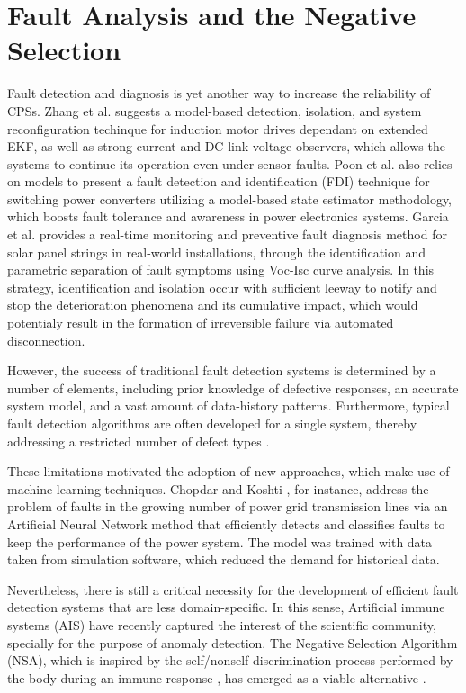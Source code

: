 \section{Fault Analysis and the Negative Selection}

Fault detection and diagnosis is yet another way to increase the reliability of CPSs. Zhang et al. \cite{zhang2013sensor} suggests a model-based detection, isolation, and system reconfiguration techinque for induction motor drives dependant on extended EKF, as well as strong current and DC-link voltage observers, which allows the systems to continue its operation even under sensor faults. Poon et al. \cite{poon2016model} also relies on models to present a fault detection and identification (FDI) technique for switching power converters utilizing a model-based state estimator methodology, which boosts fault tolerance and awareness in power electronics systems. Garcia et al. \cite{garcia2022solar} provides a real-time monitoring and preventive fault diagnosis method for solar panel strings in real-world installations, through the identification and parametric separation of fault symptoms using Voc-Isc curve analysis. In this strategy, identification and isolation occur with sufficient leeway to notify and stop the deterioration phenomena and its cumulative impact, which would potentialy result in the formation of irreversible failure via automated disconnection.

However, the success of traditional fault detection systems is determined by a number of elements, including prior knowledge of defective responses, an accurate system model, and a vast amount of data-history patterns. Furthermore, typical fault detection algorithms are often developed for a single system, thereby addressing a restricted number of defect types \cite{abid2020improved}.

These limitations motivated the adoption of new approaches, which make use of machine learning techniques. Chopdar and Koshti \cite{9848016}, for instance, address the problem of faults in the growing number of power grid transmission lines via an Artificial Neural Network method that efficiently detects and classifies faults to keep the performance of the power system. The model was trained with data taken from simulation software, which reduced the demand for historical data.

Nevertheless, there is still a critical necessity for the development of efficient fault detection systems that are less domain-specific. In this sense, Artificial immune systems (AIS) have recently captured the interest of the scientific community, specially for the purpose of anomaly detection. The Negative Selection Algorithm (NSA), which is inspired by the self/nonself discrimination process performed by the body during an immune response \cite{Kuby2019}, has emerged as a viable alternative \cite{abid2020improved}.

